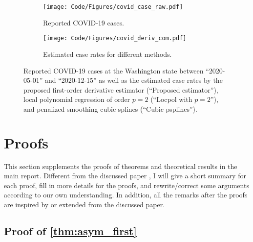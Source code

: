 \documentclass{uwstat572}
\theoremstyle{definition}
\theoremstyle{theorem}
\begin{document}
\begin{figure}[!t]
	\captionsetup[subfigure]{justification=centering}
	\begin{subfigure}[t]{0.49\linewidth}
		\centering
		\texttt{[image: Code/Figures/covid\_case\_raw.pdf]}
		\caption{Reported COVID-19 cases.}
	\end{subfigure}
	\hfil
	\begin{subfigure}[t]{0.49\linewidth}
		\centering
		\texttt{[image: Code/Figures/covid\_deriv\_com.pdf]}
		\caption{Estimated case rates for different methods.}
	\end{subfigure}
	\caption{Reported COVID-19 cases at the Washington state between ``2020-05-01'' and ``2020-12-15'' as well as the estimated case rates by the proposed first-order derivative estimator (``Proposed estimator''), local polynomial regression of order $p=2$ (``Locpol with $p=2$''), and penalized smoothing cubic splines (``Cubic psplines'').}
	\label{fig:case_study}
\end{figure}

\section{Proofs}
\label{App:proofs}

This section supplements the proofs of theorems and theoretical results in the main report. Different from the discussed paper \citep{liu2020smoothed}, I will give a short summary for each proof, fill in more details for the proofs, and rewrite/correct some arguments according to our own understanding. In addition, all the remarks after the proofs are inspired by or extended from the discussed paper.

\subsection{Proof of \autoref{thm:asym_first}}
\label{App:proof_thm1}
\end{document}
